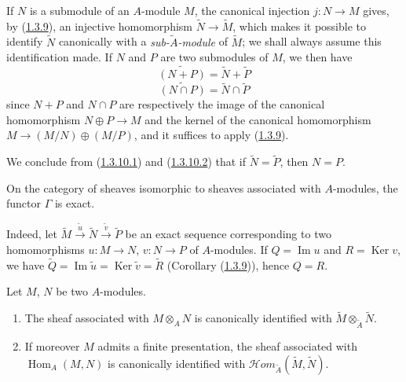 \begin{env}[1.3.10]
\label{I.1.3.10}
If $N$ is a submodule of an $A$-module $M$, the canonical injection
$j:N\to M$ gives, by (\hyperref[I.1.3.9]{1.3.9}), an injective
homomorphism $\widetilde{N}\to\widetilde{M}$, which makes it possible to
identify $\widetilde{N}$ canonically with a \emph{sub-$\widetilde{A}$-module}
of $\widetilde{M}$; we shall always assume this identification made. If $N$
and $P$ are two submodules of $M$, we then have
\begin{equation}
  \widetilde{(N+P)}=\widetilde{N}+\widetilde{P}
  \tag{1.3.10.1}\label{I.1.3.10.1}
\end{equation}
\begin{equation}
  \widetilde{(N\cap P)}=\widetilde{N}\cap\widetilde{P}
  \tag{1.3.10.2}\label{I.1.3.10.2}
\end{equation}
since $N+P$ and $N\cap P$ are respectively the image of the canonical
homomorphism $N\oplus P\to M$ and the kernel of the canonical homomorphism
$M\to(M/N)\oplus(M/P)$, and it suffices to apply
(\hyperref[I.1.3.9]{1.3.9}).

We conclude from (\hyperref[I.1.3.10.1]{1.3.10.1}) and
(\hyperref[I.1.3.10.2]{1.3.10.2}) that if
$\widetilde{N}=\widetilde{P}$, then $N=P$.
\end{env}

\begin{corollary}[1.3.11]
\label{I.1.3.11}
On the category of sheaves isomorphic to sheaves associated with
$A$-modules, the functor $\Gamma$ is exact.
\end{corollary}

Indeed, let
$\widetilde{M}\xrightarrow{\widetilde{u}}\widetilde{N}
\xrightarrow{\widetilde{v}}\widetilde{P}$ be an exact sequence corresponding
to two homomorphisms $u:M\to N$, $v:N\to P$ of $A$-modules. If
$Q=\operatorname{Im}u$ and $R=\operatorname{Ker}v$, we have
$\widetilde{Q}=\operatorname{Im}\widetilde{u}
=\operatorname{Ker}\widetilde{v}=\widetilde{R}$
(Corollary (\hyperref[I.1.3.9]{1.3.9})), hence $Q=R$.

\begin{corollary}[1.3.12]
\label{I.1.3.12}
Let $M$, $N$ be two $A$-modules.
\begin{enumerate}
  \item[\rm(i)] The sheaf associated with $M\otimes_A N$ is canonically
  identified with $\widetilde{M}\otimes_{\widetilde{A}}\widetilde{N}$.
  \item[\rm(ii)] If moreover $M$ admits a finite presentation, the sheaf
  associated with $\operatorname{Hom}_A(M,N)$ is canonically identified with
  $\mathscr{H}\!om_{\widetilde{A}}(\widetilde{M},\widetilde{N})$.
\end{enumerate}
\end{corollary}

